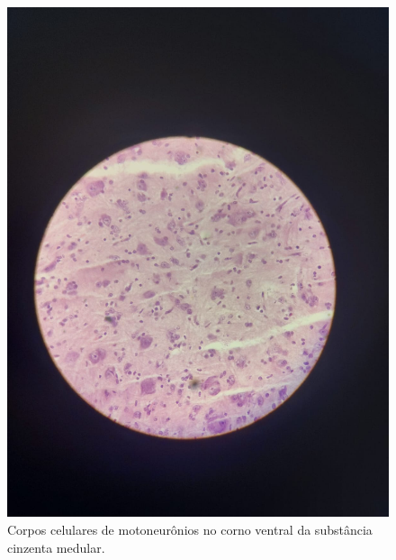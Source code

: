 \documentclass[
]{book}
\begin{document}
\begin{figure}
\centering
\includegraphics{images/neuro-motoneuronios.jpeg}
\caption{\label{fig:unnamed-chunk-7}Corpos celulares de motoneurônios no corno ventral da substância cinzenta medular.}
\end{figure}
\end{document}

